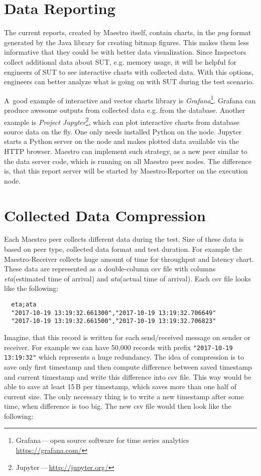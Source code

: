\section{Data Reporting}
The current reports, created by Maestro itself, contain charts, in the \emph{png} format generated by the Java library for creating bitmap figures. This makes them less informative that they could be with better data visualization. Since Inspectors collect additional data about SUT, e.g. memory usage, it will be helpful for engineers of SUT to see interactive charts with collected data. With this options, engineers can better analyze what is going on with SUT during the test scenario.

A~good example of interactive and vector charts library is \emph{Grafana}\footnote{Grafana\,---\,open source software for time series analytics \url{https://grafana.com/}}. Grafana can produce awesome outputs from collected data e.g. from the database. Another example is \emph{Project Jupyter}\footnote{Jupyter\,---\,\url{http://jupyter.org/}}, which can plot interactive charts from database source data on the fly. One only needs installed Python on the node. Jupyter starts a Python server on the node and makes plotted data available via the HTTP browser. Maestro can implement such strategy, as a new peer similar to the data server code, which is running on all Maestro peer nodes. The difference is, that this report server will be started by Maestro-Reporter on the execution node.

\section{Collected Data Compression}
Each Maestro peer collects different data during the test. Size of these data is based on peer type, collected data format and test duration. For example the Maestro-Receiver collects huge amount of time for throughput and latency chart. These data are represented as a double-column csv file with columns \emph{eta}(estimated time of arrival) and \emph{ata}(actual time of arrival). Each csv file looks like the following:

\begin{verbatim}
  eta;ata
  "2017-10-19 13:19:32.661300","2017-10-19 13:19:32.706649"
  "2017-10-19 13:19:32.661500","2017-10-19 13:19:32.706823"
\end{verbatim}

Imagine, that this record is written for each send/received message on sender or receiver. For example we can have 50,000 records with prefix \texttt{"2017-10-19 13:19:32"} which represents a huge redundancy. The idea of compression is to save only first timestamp and then compute difference between saved timestamp and current timestamp and write this difference into csv file. This way would be able to save at least 15\,B per timestamp, which saves more than one half of current size. The only necessary thing is to write a new timestamp after some time, when difference is too big. The new csv file would then look like the following:

